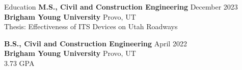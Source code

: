 \documentclass{resume} %
\begin{document}

\begin{rSection}{Education}
{\bf M.S., Civil and Construction Engineering} \hfill December 2023\\ 
{\bf Brigham Young University} \hfill Provo, UT \\
{Thesis: Effectiveness of ITS Devices on Utah Roadways} \smallskip 

{\bf B.S., Civil and Construction Engineering}  \hfill  April 2022 \\
{\bf Brigham Young University} \hfill Provo, UT \\
{3.73 GPA} \smallskip 
\end{rSection}

\end{document}
